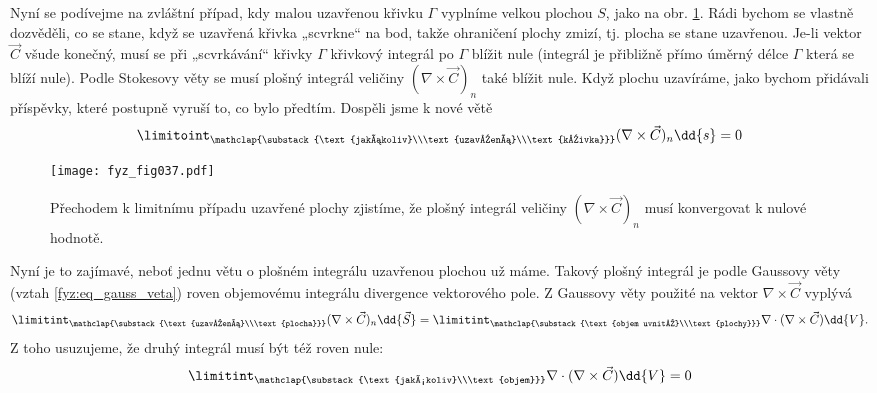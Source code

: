        
    Nyní se podívejme na zvláštní případ, kdy malou uzavřenou křivku \(\Gamma\) vyplníme velkou 
    plochou \(S\), jako na obr. \ref{fyz:fig037}. Rádi bychom se vlastně dozvěděli, co se 
    stane, když se uzavřená křivka „scvrkne“ na bod, takže ohraničení plochy zmizí, tj. plocha se 
    stane uzavřenou. Je-li vektor \(\vec{C}\) všude konečný, musí se při „scvrkávání“ křivky 
    \(\Gamma\) křivkový integrál po \(\Gamma\) blížit nule (integrál je přibližně přímo úměrný 
    délce \(\Gamma\) která se blíží nule). Podle Stokesovy věty se musí plošný integrál veličiny 
    \((\nabla\times\vec{C})_n\) také blížit nule. Když plochu uzavíráme, jako bychom přidávali 
    příspěvky, které postupně vyruší to, co bylo předtím. Dospěli jsme k nové větě
    \begin{equation}\label{fyz:eq_fey_null1} 
      \limitoint_{\mathclap{\substack{\text{jakákoliv}\\\text{uzavřená}\\\text{křivka}}}}
       (\nabla\times\vec{C})_n \dd{s} = 0
    \end{equation}

    \begin{figure}[ht!]  %
      \centering
      \texttt{[image: fyz\_fig037.pdf]}
      \caption{Přechodem k limitnímu případu uzavřené plochy zjistíme, že plošný integrál veličiny
               \((\nabla\times\vec{C})_n\) musí konvergovat k nulové hodnotě.
               \cite[s.~60]{Feynman02}}
      \label{fyz:fig037}
    \end{figure}
    Nyní je to zajímavé, neboť jednu větu o plošném integrálu uzavřenou plochou už máme. Takový 
    plošný integrál je podle Gaussovy věty (vztah \ref{fyz:eq_gauss_veta}) roven objemovému 
    integrálu divergence vektorového pole. Z Gaussovy věty použité na vektor 
    \(\nabla\times\vec{C}\) vyplývá
    \begin{equation}\label{fyz:eq_fey_null2} 
      \limitint_{\mathclap{\substack{\text{uzavřená}\\\text{plocha}}}}
       (\nabla\times\vec{C})_n \dd{\vec{S}}
      =
      \limitint_{\mathclap{\substack{\text{objem uvnitř}\\\text{plochy}}}}
        \nabla\cdot(\nabla\times\vec{C})\dd{V}.
    \end{equation}
    Z toho usuzujeme, že druhý integrál musí být též roven nule:
    \begin{equation}\label{fyz:eq_fey_null3} 
     \limitint_{\mathclap{\substack{\text{jakýkoliv}\\\text{objem}}}}
      \nabla\cdot(\nabla\times\vec{C})\dd{V} = 0
    \end{equation}
            
